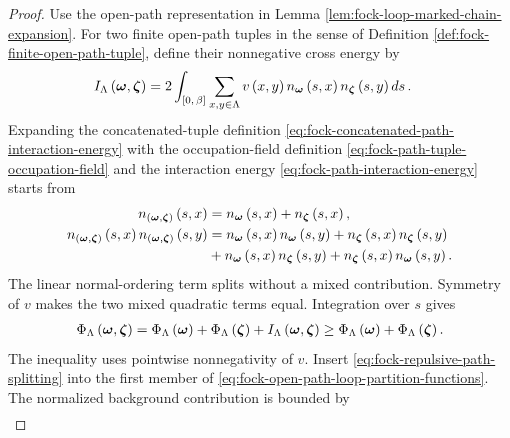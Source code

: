 \documentclass[11pt,a4paper]{article}
\theoremstyle{plain}
\theoremstyle{definition}
\theoremstyle{remark}
\begin{document}
\begin{proof}
Use the open-path representation in Lemma \ref{lem:fock-loop-marked-chain-expansion}.
For two finite open-path tuples in the sense of Definition \ref{def:fock-finite-open-path-tuple}, define their
nonnegative cross energy by
$$\begin{aligned}
\fun{I_{\Lambda}}{\boldsymbol{\omega},\boldsymbol{\zeta}}
& =
2\int_{\closedinterval{0}{\beta}}
\sum_{x,y \in \Lambda}
\fun{v}{x,y}
\fun{n_{\boldsymbol{\omega}}}{s,x}
\fun{n_{\boldsymbol{\zeta}}}{s,y}
\opdmsr{s}.
\end{aligned}$$
Expanding the concatenated-tuple definition
\eqref{eq:fock-concatenated-path-interaction-energy} with the occupation-field definition
\eqref{eq:fock-path-tuple-occupation-field} and the interaction energy
\eqref{eq:fock-path-interaction-energy} starts from
$$\begin{aligned}
\fun{n_{\rbk{\boldsymbol{\omega},\boldsymbol{\zeta}}}}{s,x}
& =
\fun{n_{\boldsymbol{\omega}}}{s,x}
+
\fun{n_{\boldsymbol{\zeta}}}{s,x},
\\
\fun{n_{\rbk{\boldsymbol{\omega},\boldsymbol{\zeta}}}}{s,x}
\fun{n_{\rbk{\boldsymbol{\omega},\boldsymbol{\zeta}}}}{s,y}
& =
\fun{n_{\boldsymbol{\omega}}}{s,x}
\fun{n_{\boldsymbol{\omega}}}{s,y}
+
\fun{n_{\boldsymbol{\zeta}}}{s,x}
\fun{n_{\boldsymbol{\zeta}}}{s,y}
\\
& +
\fun{n_{\boldsymbol{\omega}}}{s,x}
\fun{n_{\boldsymbol{\zeta}}}{s,y}
+
\fun{n_{\boldsymbol{\zeta}}}{s,x}
\fun{n_{\boldsymbol{\omega}}}{s,y}.
\end{aligned}$$
The linear normal-ordering term splits without a mixed contribution.
Symmetry of $v$ makes the two mixed quadratic terms equal.
Integration over $s$ gives
\begin{equation}
\begin{aligned}
\Phi_{\Lambda} \left( \boldsymbol{\omega},\boldsymbol{\zeta} \right)
=
\Phi_{\Lambda} \left( \boldsymbol{\omega} \right)
+
\Phi_{\Lambda} \left( \boldsymbol{\zeta} \right)
+
I_{\Lambda} \left( \boldsymbol{\omega},\boldsymbol{\zeta} \right)
\geq
\Phi_{\Lambda} \left( \boldsymbol{\omega} \right)
+
\Phi_{\Lambda} \left( \boldsymbol{\zeta} \right).
\end{aligned}
\label{eq:fock-repulsive-path-splitting}
\end{equation}
The inequality uses pointwise nonnegativity of $v$.
Insert \eqref{eq:fock-repulsive-path-splitting} into the first member of
\eqref{eq:fock-open-path-loop-partition-functions}.
The normalized background contribution is bounded by
$$\begin{aligned}

\end{aligned}$$
\end{proof}
\end{document}
